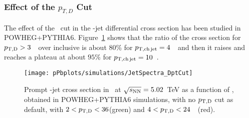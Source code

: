 %

\subsubsection{Effect of the $p_{T,D}$ Cut}
The effect of the \ptd\ cut in the \Dstar-jet differential cross section has been studied in POWHEG+PYTHIA6.
Figure~\ref{fig:PromptDSim_JetSpectraComparison_PtDCut} shows that
the ratio of the cross section for $p_{\mathrm{T,D}}>3$~\GeVc\ over inclusive is about $80$\% for $p_{\mathrm{T,ch\, jet}}=4$~\GeVc\ and then it raises and reaches a plateau at about $95$\% for $p_{\mathrm{T,ch\, jet}}=10$~\GeVc.

\begin{figure}[bth]
\begin{center}
\texttt{[image: pPbplots/simulations/JetSpectra\_DptCut]}
\caption{Prompt \Dstar-jet cross section in \pPb\ at $\sqrt{s_{\rm NN}}=5.02$~TeV as a function of \ptchjet, obtained in POWHEG+PYTHIA6 simulations, with no $p_{\mathrm{T,D}}$ cut as default, with $2 < p_{\mathrm{T,D}} < 36$(green) and $4 < p_{\mathrm{T,D}} < 24$~\GeVc\ (red).} 
\label{fig:PromptDSim_JetSpectraComparison_PtDCut}
\end{center}
\end{figure}

